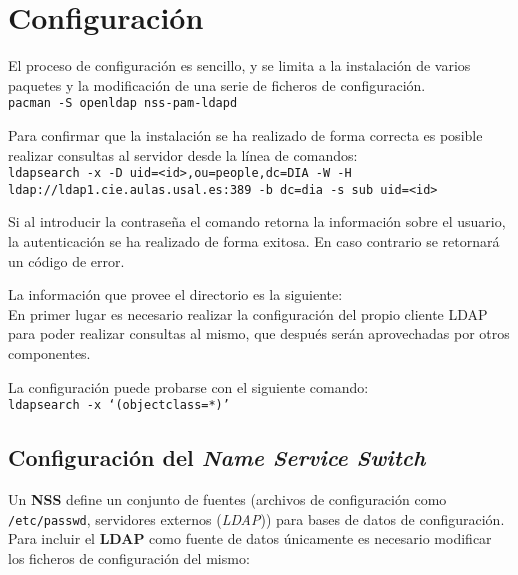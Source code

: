 \documentclass{article}
\begin{document}
\section{Configuración}

El proceso de configuración es sencillo, y se limita a la instalación de varios paquetes y la modificación de una serie de ficheros de configuración.\\

\texttt{pacman -S openldap nss-pam-ldapd}

Para confirmar que la instalación se ha realizado de forma correcta es posible realizar consultas al servidor desde la línea de comandos:\\

\texttt{ldapsearch -x -D uid=<id>,ou=people,dc=DIA -W -H ldap://ldap1.cie.aulas.usal.es:389 -b dc=dia -s sub uid=<id>}

Si al introducir la contraseña el comando retorna la información sobre el usuario, la autenticación se ha realizado de forma exitosa. En caso contrario se retornará un código de error.

La información que provee el directorio es la siguiente:\\


En primer lugar es necesario realizar la configuración del propio cliente LDAP para poder realizar consultas al mismo, que después serán aprovechadas por otros componentes. 


La configuración puede probarse con el siguiente comando:\\

\texttt{ldapsearch -x `(objectclass=*)'}

\subsection{Configuración del \textit{Name Service Switch}}

Un \textbf{NSS} define un conjunto de fuentes (archivos de configuración como \texttt{/etc/passwd}, servidores externos (\textit{LDAP})) para bases de datos de configuración. Para incluir el \textbf{LDAP} como fuente de datos únicamente es necesario modificar los ficheros de configuración del mismo:
\end{document}
